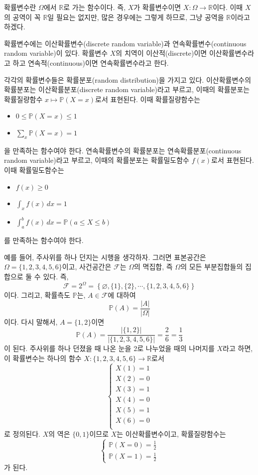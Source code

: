 \documentclass{article}
\begin{document}
확률변수란 \(\Omega\)에서 \(\mathbb R\)로 가는 함수이다.
즉, \(X\)가 확률변수이면 \(X:\Omega\to\mathbb R\)이다.
이때 \(X\)의 공역이 꼭 \(\mathbb R\)일 필요는 없지만, 많은 경우에는 그렇게 하므로, 그냥 공역을 \(\mathbb R\)이라고 하겠다.

확률변수에는 이산확률변수(discrete random variable)과 연속확률변수(continuous random variable)이 있다.
확률변수 \(X\)의 치역이 이산적(discrete)이면 이산확률변수라고 하고 연속적(continuous)이면 연속확률변수라고 한다.

각각의 확률변수들은 확률분포(random distribution)을 가지고 있다.
이산확률변수의 확률분포는 이산확률분포(discrete random variable)라고 부르고, 이때의 확률분포는 확률질량함수 \(x\mapsto\mathbb P(X=x)\)로서 표현된다.
이때 확률질량함수는
\begin{itemize}
\item
\(0\le\mathbb P(X=x)\le1\)
\item
\(\sum_x\mathbb P(X=x)=1\)
\end{itemize}
을 만족하는 함수여야 한다.
연속확률변수의 확률분포는 연속확률분포(continuous random variable)라고 부르고, 이때의 확률분포는 확률밀도함수 \(f(x)\)로서 표현된다.
이때 확률밀도함수는
\begin{itemize}
\item
\(f(x)\ge0\)
\item
\(\int_xf(x)\,dx=1\)
\item
\(\int_a^bf(x)\,dx=\mathbb P(a\le X\le b)\)
\end{itemize}
를 만족하는 함수여야 한다.

예를 들어, 주사위를 하나 던지는 시행을 생각하자.
그러면 표본공간은 \(\Omega=\{1,2,3,4,5,6\}\)이고, 사건공간은 \(\mathcal F\)는 \(\Omega\)의 멱집합, 즉 \(\Omega\)의 모든 부분집합들의 집합으로 둘 수 있다.
즉,
\[\mathcal F=2^\Omega=\left\{\varnothing,\{1\},\{2\},\cdots,\{1,2,3,4,5,6\}\right\}\]
이다.
그리고, 확률측도 \(\mathbb P\)는, \(A\in\mathcal F\)에 대하여
\[\mathbb P(A)=\frac{|A|}{|\Omega|}\]
이다.
다시 말해서, \(A=\{1,2\}\)이면
\[\mathbb P(A)=\frac{|\{1,2\}|}{|\{1,2,3,4,5,6\}|}=\frac26=\frac13\]
이 된다.
주사위를 하나 던졌을 때 나온 눈을 2로 나누었을 때의 나머지를 \(X\)라고 하면, 이 확률변수는 하나의 함수 \(X:\{1,2,3,4,5,6\}\to\mathbb R\)로서
\[\begin{cases}
X(1)=1\\
X(2)=0\\
X(3)=1\\
X(4)=0\\
X(5)=1\\
X(6)=0\\
\end{cases}\]
로 정의된다.
\(X\)의 역은 \(\{0,1\}\)이므로 \(X\)는 이산확률변수이고, 확률질량함수는
\[\begin{cases}
\mathbb P(X=0)=\frac12\\
\mathbb P(X=1)=\frac12
\end{cases}\]
가 된다.
\end{document}
